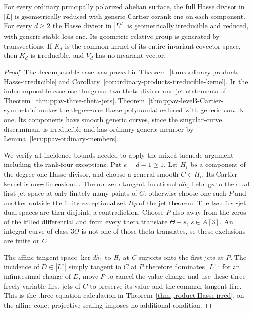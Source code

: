 \begin{theorem}
\label{thm:ordinary-ppav-Hasse-kernel}
For every ordinary principally polarized abelian surface, the full Hasse
divisor in $|L|$ is geometrically reduced with generic Cartier corank one
on each component. For every $d\ge2$ the Hasse divisor in $|L^d|$ is
geometrically irreducible and reduced, with generic stable loss one.
Its geometric relative group is generated by transvections.
If $K_d$ is the common kernel of its entire invariant-covector space,
then $K_d$ is irreducible, and $V_d$ has no invariant vector.
\end{theorem}
\begin{proof}
The decomposable case was proved in
Theorem~\ref{thm:ordinary-products-Hasse-irreducible} and
Corollary~\ref{cor:ordinary-products-irreducible-kernel}.
In the indecomposable case use the genus-two theta divisor and jet
statements of Theorem~\ref{thm:ppav-three-theta-jets}.
Theorem~\ref{thm:ppav-level3-Cartier-symmetric} makes the degree-one Hasse
polynomial reduced with generic corank one. Its components have smooth
generic curves, since the singular-curve discriminant is irreducible and
has ordinary generic member by Lemma~\ref{lem:ppav-ordinary-members}.

We verify all incidence bounds needed to apply the mixed-tacnode argument,
including the rank-four exceptions. Put $e=d-1\ge1$. Let $H_i$ be a
component of the degree-one Hasse divisor, and choose a general smooth
$C\in H_i$. Its Cartier kernel is one-dimensional. The nonzero tangent
functional $dh_1$ belongs to the dual first-jet space at only finitely many
points of $C$: otherwise choose one such $P$ and another outside the
finite exceptional set $R_P$ of the jet theorem. The two first-jet dual
spaces are then disjoint, a contradiction. Choose $P$ also away from the
zeros of the killed differential and from every theta translate
$\Theta-s$, $s\in A[3]$. An integral curve of class $3\Theta$ is not one
of those theta translates, so these exclusions are finite on $C$.

The affine tangent space $\ker dh_1$ to $H_i$ at $C$ surjects onto the
first jets at $P$. The incidence of $D\in|L^e|$ simply tangent to $C$ at
$P$ therefore dominates $|L^e|$: for an infinitesimal change of $D$, move
$P$ to cancel the value change and use these three freely variable first
jets of $C$ to preserve its value and the common tangent line. This is
the three-equation calculation in
Theorem~\ref{thm:product-Hasse-irred}, on the affine cone; projective
scaling imposes no additional condition.


\end{proof}
